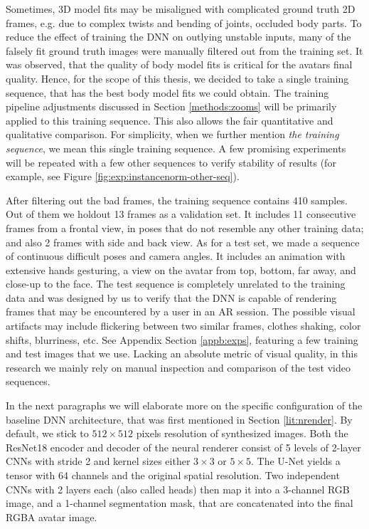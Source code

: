 Sometimes, 3D model fits may be misaligned with complicated ground truth 2D frames, e.g. due to complex twists and bending of joints, occluded body parts. To reduce the effect of training the DNN on outlying unstable inputs, many of the falsely fit ground truth images were manually filtered out from the training set. It was observed, that the quality of body model fits is critical for the avatars final quality. Hence, for the scope of this thesis, we decided to take a single training sequence, that has the best body model fits we could obtain. The training pipeline adjustments discussed in Section \ref{methods:zooms} will be primarily applied to this training sequence. This also allows the fair quantitative and qualitative comparison. For simplicity, when we further mention \textit{the training sequence}, we mean this single training sequence. A few promising experiments will be repeated with a few other sequences to verify stability of results (for example, see Figure \ref{fig:exp:instancenorm-other-seq}). 

After filtering out the bad frames, the training sequence contains 410 samples. Out of them we holdout 13 frames as a validation set. It includes 11 consecutive frames from a frontal view, in poses that do not resemble any other training data; and also 2 frames with side and back view. As for a test set, we made a sequence of continuous difficult poses and camera angles. It includes an animation with extensive hands gesturing, a view on the avatar from top, bottom, far away, and close-up to the face. The test sequence is completely unrelated to the training data and was designed by us to verify that the DNN is capable of rendering frames that may be encountered by a user in an AR session. The possible visual artifacts may include flickering between two similar frames, clothes shaking, color shifts, blurriness, etc. See Appendix Section \ref{appb:exps}, featuring a few training and test images that we use. Lacking an absolute metric of visual quality, in this research we mainly rely on manual inspection and comparison of the test video sequences. 

In the next paragraphs we will elaborate more on the specific configuration of the baseline DNN architecture, that was first mentioned in Section \ref{lit:nrender}. By default, we stick to $512\times512$ pixels resolution of synthesized images. Both the ResNet18 encoder and decoder of the neural renderer consist of 5 levels of 2-layer CNNs with stride 2 and kernel sizes either $3\times3$ or $5\times5$. The U-Net yields a tensor with 64 channels and the original spatial resolution. Two independent CNNs with 2 layers each (also called heads) then map it into a 3-channel RGB image, and a 1-channel segmentation mask, that are concatenated into the final RGBA avatar image.

